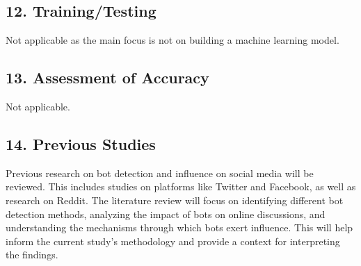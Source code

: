 \documentclass[
  letterpaper,
  DIV=11,
  numbers=noendperiod]{scrartcl}
\begin{document}
\subsection{12. Training/Testing}\label{trainingtesting}

Not applicable as the main focus is not on building a machine learning
model.

\subsection{13. Assessment of Accuracy}\label{assessment-of-accuracy}

Not applicable.

\subsection{14. Previous Studies}\label{previous-studies}

Previous research on bot detection and influence on social media will be
reviewed. This includes studies on platforms like Twitter and Facebook,
as well as research on Reddit. The literature review will focus on
identifying different bot detection methods, analyzing the impact of
bots on online discussions, and understanding the mechanisms through
which bots exert influence. This will help inform the current study's
methodology and provide a context for interpreting the findings.
\end{document}
